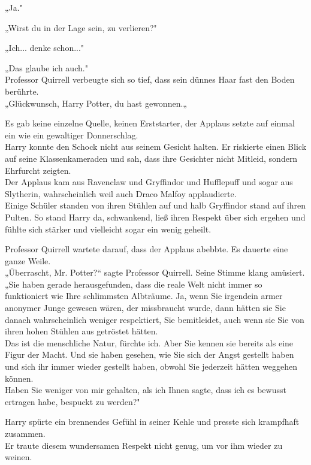 {„Ja."

„Wirst du in der Lage sein, zu verlieren?"

„Ich... denke schon..."

„Das glaube ich auch."\\ Professor Quirrell verbeugte sich so tief, dass sein dünnes Haar fast den Boden berührte.\\ „Glückwunsch, Harry Potter, du hast gewonnen.„

Es gab keine einzelne Quelle, keinen Erststarter, der Applaus setzte auf einmal ein wie ein gewaltiger Donnerschlag.\\ Harry konnte den Schock nicht aus seinem Gesicht halten. Er riskierte einen Blick auf seine Klassenkameraden und sah, dass ihre Gesichter nicht Mitleid, sondern Ehrfurcht zeigten.\\ Der Applaus kam aus Ravenclaw und Gryffindor und Hufflepuff und sogar aus Slytherin, wahrscheinlich weil auch Draco Malfoy applaudierte.\\ Einige Schüler standen von ihren Stühlen auf und halb Gryffindor stand auf ihren Pulten. So stand Harry da, schwankend, ließ ihren Respekt über sich ergehen und fühlte sich stärker und vielleicht sogar ein wenig geheilt.

Professor Quirrell wartete darauf, dass der Applaus abebbte. Es dauerte eine ganze Weile.\\ „Überrascht, Mr. Potter?“ sagte Professor Quirrell. Seine Stimme klang amüsiert.\\ „Sie haben gerade herausgefunden, dass die reale Welt nicht immer so funktioniert wie Ihre schlimmsten Albträume. Ja, wenn Sie irgendein armer anonymer Junge gewesen wären, der missbraucht wurde, dann hätten sie Sie danach wahrscheinlich weniger respektiert, Sie bemitleidet, auch wenn sie Sie von ihren hohen Stühlen aus getröstet hätten.\\ Das ist die menschliche Natur, fürchte ich. Aber Sie kennen sie bereits als eine Figur der Macht. Und sie haben gesehen, wie Sie sich der Angst gestellt haben und sich ihr immer wieder gestellt haben, obwohl Sie jederzeit hätten weggehen können.\\ Haben Sie weniger von mir gehalten, als ich Ihnen sagte, dass ich es bewusst ertragen habe, bespuckt zu werden?"

Harry spürte ein brennendes Gefühl in seiner Kehle und presste sich krampfhaft zusammen.\\ Er traute diesem wundersamen Respekt nicht genug, um vor ihm wieder zu weinen.

}
